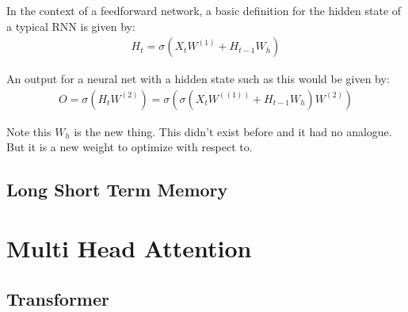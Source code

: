 \documentclass{article}
\begin{document}
In the context of a feedforward network, a basic definition for the hidden state of a typical RNN is given by:
\begin{align*}
H_{t} = \sigma( X_t W^{(1)} + H_{t-1} W_{h} )
\end{align*}

An output for a neural net with a hidden state such as this would be given by:
\begin{align*}
O = \sigma( H_t W^{(2)} ) = \sigma(\sigma( X_t W^{((1))} + H_{t-1} W_{h} )W^{(2)} )
\end{align*}

Note this $W_{h}$ is the new thing. This didn't exist before and it had no analogue. But it is a new weight to optimize with respect to.

\subsection*{Long Short Term Memory}

\section{Multi Head Attention}

\subsection{Transformer}
\end{document}
